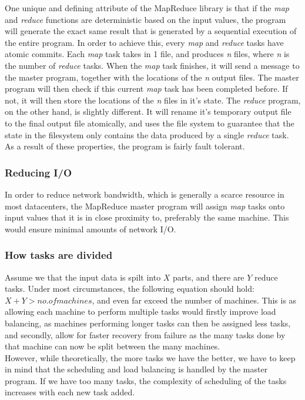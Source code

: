 \documentclass[]{article}
\begin{document}
One unique and defining attribute of the MapReduce library is that if the \emph{map} and \emph{reduce} functions are deterministic based on the input values, the program will generate the exact same result that is generated by a sequential execution of the entire program. In order to achieve this, every \emph{map} and \emph{reduce} tasks have atomic commits. Each \emph{map} task takes in 1 file, and produces \emph{n} files, where \emph{n} is the number of \emph{reduce} tasks. When the \emph{map} task finishes, it will send a message to the master program, together with the locations of the \emph{n} output files. The master program will then check if this current \emph{map} task has been completed before. If not, it will then store the locations of the \emph{n} files in it's state. The \emph{reduce} program, on the other hand, is slightly different. It will rename it's temporary output file to the final output file atomically, and uses the file system to guarantee that the state in the filesystem only contains the data produced by a single \emph{reduce} task. As a result of these properties, the program is fairly fault tolerant.\\

\subsubsection{Reducing I/O}
In order to reduce network bandwidth, which is generally a scarce resource in most datacenters, the MapReduce master program will assign \emph{map} tasks onto input values that it is in close proximity to, preferably the same machine. This would ensure minimal amounts of network I/O. \\ 

\subsubsection{How tasks are divided}
Assume we that the input data is spilt into $X$ parts, and there are $Y$ reduce tasks. Under most circumstances, the following equation should hold: $X + Y > no. of machines$, and even far exceed the number of machines. This is as allowing each machine to perform multiple tasks would firstly improve load balancing, as machines performing longer tasks can then be assigned less tasks, and secondly, allow for faster recovery from failure as the many tasks done by that machine can now be split between the many machines.\\

However, while theoretically, the more tasks we have the better, we have to keep in mind that the scheduling and load balancing is handled by the master program. If we have too many tasks, the complexity of scheduling of the tasks increases with each new task added. \\
\end{document}
